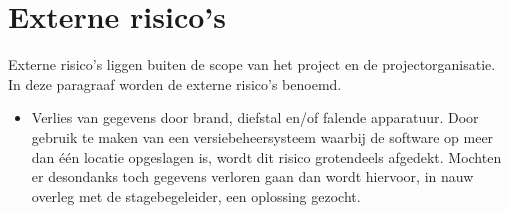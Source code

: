 \begin{itemize}
\end{itemize}

\section{Externe risico's}
Externe risico's liggen buiten de scope van het project en de projectorganisatie. In deze paragraaf worden de externe risico's benoemd.\par
\begin{itemize}
\item Verlies van gegevens door brand, diefstal en/of falende apparatuur. Door gebruik te maken van een versiebeheersysteem waarbij de software op meer dan één locatie opgeslagen is, wordt dit risico grotendeels afgedekt. Mochten er desondanks toch gegevens verloren gaan dan wordt hiervoor, in nauw overleg met de stagebegeleider, een oplossing gezocht.
\end{itemize}
